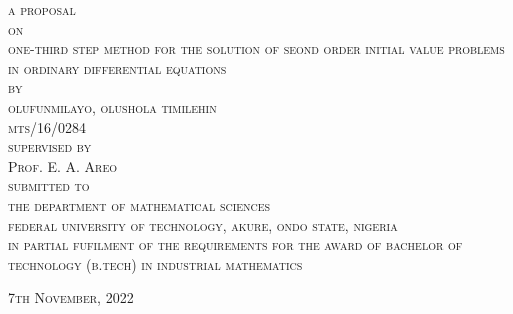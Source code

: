 \documentclass[12pt]{article}
\begin{document}
\begin{titlepage}
	\begin{center}
		\Large \textsc{a proposal}\\
		[5mm]
		\Large \textsc{on}\\
		[5mm]
		\Large \textsc{one-third step method for the solution of seond order initial value problems in ordinary differential equations}\\
		[5mm]
		\Large \textsc{by}\\
		[5mm]
		\Large \textsc{olufunmilayo, olushola timilehin \\ mts/16/0284}\\
		[5mm]
		\Large \textsc{supervised by}\\
		\Large \textsc{Prof. E. A. Areo}\\
		[5mm]
		\Large \textsc{submitted to}\\
		\Large \textsc{the department of mathematical sciences} \\ 
		\Large \textsc{federal university of technology, akure, ondo state, nigeria}\\
		[5mm]
		\Large \textsc{in partial fufilment of the requirements for the award of bachelor of technology (b.tech) in industrial mathematics}\\
		[12mm]
	\end{center}
	
	\begin{flushright}
		\large \textsc{7th November, 2022}
	\end{flushright}

\end{titlepage}

\newpage
{}
\end{document}
